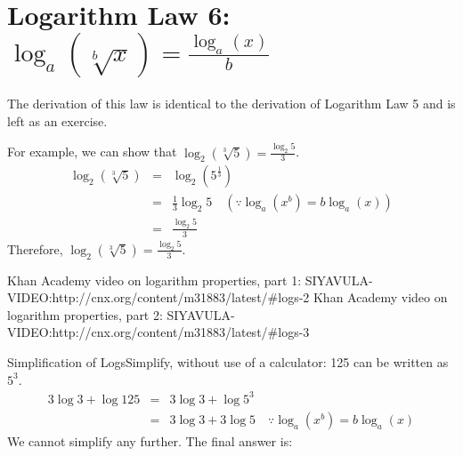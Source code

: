 \section{Logarithm Law 6: $\log_{a}\left(\sqrt[b]{x}\right) = \frac{\log_{a}(x)}{b}$}

The derivation of this law is identical to the derivation of Logarithm Law 5 and is left as an exercise.

For example, we can show that $\log_{2}(\sqrt[3]{5}) = \frac{\log_{2}5}{3} $.
\begin{eqnarray*}
\log_{2}(\sqrt[3]{5}) &=& \log_2 (5^{\frac{1}{3}})\\
&=& \frac{1}{3} \log_2 5 \quad (\because \log_{a}(x^b) = b \log_{a}(x))\\
&=&\frac{\log_{2}5}{3}
\end{eqnarray*}
Therefore, $\log_{2}(\sqrt[3]{5}) = \frac{\log_{2}5}{3}$.


Khan Academy video on logarithm properties, part 1: SIYAVULA-VIDEO:http://cnx.org/content/m31883/latest/#logs-2
Khan Academy video on logarithm properties, part 2: SIYAVULA-VIDEO:http://cnx.org/content/m31883/latest/#logs-3

\begin{wex}{Simplification of Logs}{Simplify, without use of a calculator:
}
{
125 can be written as $5^3$.
\begin{eqnarray*}
3\log 3 + \log 125 &=&3\log 3 + \log 5^3\\
&=&3\log 3 + 3\log 5 \quad \because \log_{a}(x^b) = b \log_{a}(x)
\end{eqnarray*}
We cannot simplify any further. The final answer is:
}\end{wex}

